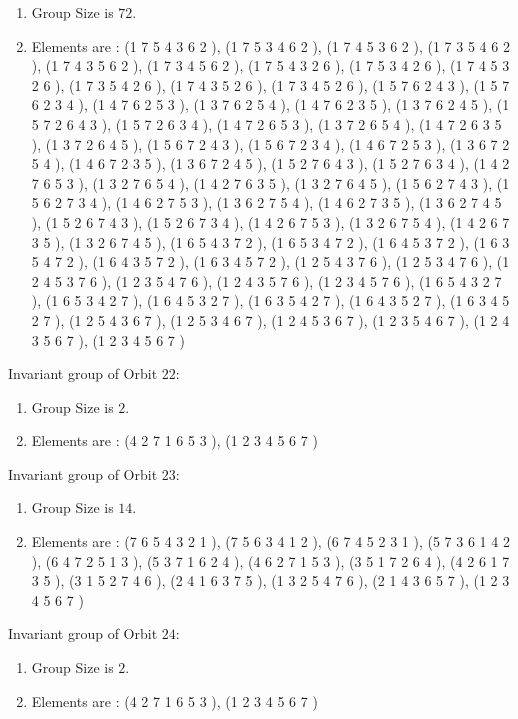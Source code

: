\documentclass[12pt]{article}
\begin{document}
\begin{enumerate}
\item Group Size is $72$.
\item Elements are : (1 7 5 4 3 6 2  ), (1 7 5 3 4 6 2  ), (1 7 4 5 3 6 2  ), (1 7 3 5 4 6 2  ), (1 7 4 3 5 6 2  ), (1 7 3 4 5 6 2  ), (1 7 5 4 3 2 6  ), (1 7 5 3 4 2 6  ), (1 7 4 5 3 2 6  ), (1 7 3 5 4 2 6  ), (1 7 4 3 5 2 6  ), (1 7 3 4 5 2 6  ), (1 5 7 6 2 4 3  ), (1 5 7 6 2 3 4  ), (1 4 7 6 2 5 3  ), (1 3 7 6 2 5 4  ), (1 4 7 6 2 3 5  ), (1 3 7 6 2 4 5  ), (1 5 7 2 6 4 3  ), (1 5 7 2 6 3 4  ), (1 4 7 2 6 5 3  ), (1 3 7 2 6 5 4  ), (1 4 7 2 6 3 5  ), (1 3 7 2 6 4 5  ), (1 5 6 7 2 4 3  ), (1 5 6 7 2 3 4  ), (1 4 6 7 2 5 3  ), (1 3 6 7 2 5 4  ), (1 4 6 7 2 3 5  ), (1 3 6 7 2 4 5  ), (1 5 2 7 6 4 3  ), (1 5 2 7 6 3 4  ), (1 4 2 7 6 5 3  ), (1 3 2 7 6 5 4  ), (1 4 2 7 6 3 5  ), (1 3 2 7 6 4 5  ), (1 5 6 2 7 4 3  ), (1 5 6 2 7 3 4  ), (1 4 6 2 7 5 3  ), (1 3 6 2 7 5 4  ), (1 4 6 2 7 3 5  ), (1 3 6 2 7 4 5  ), (1 5 2 6 7 4 3  ), (1 5 2 6 7 3 4  ), (1 4 2 6 7 5 3  ), (1 3 2 6 7 5 4  ), (1 4 2 6 7 3 5  ), (1 3 2 6 7 4 5  ), (1 6 5 4 3 7 2  ), (1 6 5 3 4 7 2  ), (1 6 4 5 3 7 2  ), (1 6 3 5 4 7 2  ), (1 6 4 3 5 7 2  ), (1 6 3 4 5 7 2  ), (1 2 5 4 3 7 6  ), (1 2 5 3 4 7 6  ), (1 2 4 5 3 7 6  ), (1 2 3 5 4 7 6  ), (1 2 4 3 5 7 6  ), (1 2 3 4 5 7 6  ), (1 6 5 4 3 2 7  ), (1 6 5 3 4 2 7  ), (1 6 4 5 3 2 7  ), (1 6 3 5 4 2 7  ), (1 6 4 3 5 2 7  ), (1 6 3 4 5 2 7  ), (1 2 5 4 3 6 7  ), (1 2 5 3 4 6 7  ), (1 2 4 5 3 6 7  ), (1 2 3 5 4 6 7  ), (1 2 4 3 5 6 7  ), (1 2 3 4 5 6 7  )
\end{enumerate}
Invariant group of Orbit $22$:
\begin{enumerate}
\item Group Size is $2$.
\item Elements are : (4 2 7 1 6 5 3  ), (1 2 3 4 5 6 7  )
\end{enumerate}
Invariant group of Orbit $23$:
\begin{enumerate}
\item Group Size is $14$.
\item Elements are : (7 6 5 4 3 2 1  ), (7 5 6 3 4 1 2  ), (6 7 4 5 2 3 1  ), (5 7 3 6 1 4 2  ), (6 4 7 2 5 1 3  ), (5 3 7 1 6 2 4  ), (4 6 2 7 1 5 3  ), (3 5 1 7 2 6 4  ), (4 2 6 1 7 3 5  ), (3 1 5 2 7 4 6  ), (2 4 1 6 3 7 5  ), (1 3 2 5 4 7 6  ), (2 1 4 3 6 5 7  ), (1 2 3 4 5 6 7  )
\end{enumerate}
Invariant group of Orbit $24$:
\begin{enumerate}
\item Group Size is $2$.
\item Elements are : (4 2 7 1 6 5 3  ), (1 2 3 4 5 6 7  )
\end{enumerate}
\end{document}
